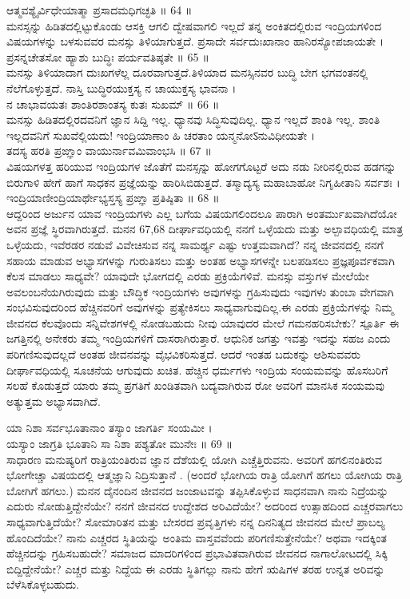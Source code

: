 ಆತ್ಮವಶ್ಯೈರ್ವಿಧೇಯಾತ್ಮಾ ಪ್ರಸಾದಮಧಿಗಚ್ಛತಿ ॥ 64 ॥\\
 ಮನಸ್ಸನ್ನು ಹಿಡಿತದಲ್ಲಿಟ್ಟುಕೊಂಡು ಆಸಕ್ತಿ ಆಗಲಿ ದ್ವೇಷವಾಗಲಿ ಇಲ್ಲದೆ ತನ್ನ ಅಂಕಿತದಲ್ಲಿರುವ ಇಂದ್ರಿಯಗಳಿಂದ ವಿಷಯಗಳನ್ನು ಬಳಸುವವರ ಮನಸ್ಸು ತಿಳಿಯಾಗುತ್ತದೆ.
ಪ್ರಸಾದೇ ಸರ್ವದುಃಖಾನಾಂ ಹಾನಿರಸ್ಯೋಪಜಾಯತೇ ।\\
ಪ್ರಸನ್ನಚೇತಸೋ ಹ್ಯಾಶು ಬುದ್ಧಿಃ ಪರ್ಯವತಿಷ್ಠತೇ ॥ 65 ॥\\
 ಮನಸ್ಸು ತಿಳಿಯಾದಾಗ ದುಃಖಗಳೆಲ್ಲ ದೂರವಾಗುತ್ತದೆ.ತಿಳಿಯಾದ ಮನಸ್ಸಿನವರ ಬುದ್ಧಿ ಬೇಗ ಭಗವಂತನಲ್ಲಿ ನೆಲೆಗೊಳ್ಳುತ್ತದೆ.
ನಾಸ್ತಿ ಬುದ್ಧಿರಯುಕ್ತಸ್ಯ ನ ಚಾಯುಕ್ತಸ್ಯ ಭಾವನಾ ।\\
ನ ಚಾಭಾವಯತಃ ಶಾಂತಿರಶಾಂತಸ್ಯ ಕುತಃ ಸುಖಮ್ ॥ 66 ॥\\
 ಮನಸ್ಸು ಹಿಡಿತದಲ್ಲಿರದವನಿಗೆ ಜ್ಞಾನ ಸಿದ್ದಿ ಇಲ್ಲ. ಧ್ಯಾನವು ಸಿದ್ಧಿಸುವುದಿಲ್ಲ. ಧ್ಯಾನ ಇಲ್ಲದೆ ಶಾಂತಿ ಇಲ್ಲ. ಶಾಂತಿ ಇಲ್ಲದವನಿಗೆ ಸುಖವೆಲ್ಲಿಯದು!
ಇಂದ್ರಿಯಾಣಾಂ ಹಿ ಚರತಾಂ ಯನ್ಮನೋऽನುವಿಧೀಯತೇ ।\\
ತದಸ್ಯ ಹರತಿ ಪ್ರಙ್ಞಾಂ ವಾಯುರ್ನಾವಮಿವಾಂಭಸಿ ॥ 67 ॥\\
 ವಿಷಯಗಳತ್ತ ಹರಿಯುವ ಇಂದ್ರಿಯಗಳ ಜೊತೆಗೆ ಮನಸ್ಸನ್ನು ಹೋಗಗೊಟ್ಟರೆ ಅದು ನಡು ನೀರಿನಲ್ಲಿರುವ ಹಡಗನ್ನು ಬಿರುಗಾಳಿ ಹೇಗೆ ಹಾಗೆ ಸಾಧಕನ ಪ್ರಜ್ಞೆಯನ್ನು ಹಾರಿಸಿಬಿಡುತ್ತದೆ.
ತಸ್ಮಾದ್ಯಸ್ಯ ಮಹಾಬಾಹೋ ನಿಗೃಹೀತಾನಿ ಸರ್ವಶಃ ।\\
ಇಂದ್ರಿಯಾಣೀಂದ್ರಿಯಾರ್ಥೇಭ್ಯಸ್ತಸ್ಯ ಪ್ರಙ್ಞಾ ಪ್ರತಿಷ್ಠಿತಾ ॥ 68 ॥\\
 ಆದ್ದರಿಂದ ಅರ್ಜುನ ಯಾವ ಇಂದ್ರಿಯಗಳು ಎಲ್ಲ ಬಗೆಯ ವಿಷಯಗಲಿಂದಲೂ ಪಾರಾಗಿ ಅಂತರ್ಮುಖವಾಗಿದೆಯೋ ಅವನ ಪ್ರಜ್ಞೆ ಸ್ಥಿರವಾಗಿರುತ್ತದೆ.
 ಮನನ  67,68
 ದೀರ್ಘಾವಧಿಯಲ್ಲಿ ನನಗೆ ಒಳ್ಳೆಯದು ಮತ್ತು ಅಲ್ಪಾವಧಿಯಲ್ಲಿ ಮಾತ್ರ ಒಳ್ಳೆಯದು, ಇವೆರಡರ ನಡುವೆ ವಿವೇಚಿಸುವ ನನ್ನ ಸಾಮರ್ಥ್ಯ ಎಷ್ಟು ಉತ್ತಮವಾಗಿದೆ? ನನ್ನ ಜೀವನದಲ್ಲಿ ನನಗೆ ಸಹಾಯ ಮಾಡುವ ಅಭ್ಯಾಸಗಳನ್ನು ಗುರುತಿಸಲು ಮತ್ತು ಅಂತಹ ಅಭ್ಯಾಸಗಳನ್ನೇ ಬಲಪಡಿಸಲು ಪ್ರಜ್ಞಪೂರ್ವಕವಾಗಿ ಕೆಲಸ ಮಾಡಲು ಸಾಧ್ಯವೇ?
 ಯಾವುದೇ ಭೋಗದಲ್ಲಿ ಎರಡು ಪ್ರಕ್ರಿಯೆಗಳಿವೆ. ಮನಸ್ಸು ವಸ್ತುಗಳ ಮೇಲೆಯೇ ಅವಲಂಬನೆಯಗಿರುವುದು ಮತ್ತು ಬೌದ್ಧಿಕ ಇಂದ್ರಿಯಗಳು ಅವುಗಳನ್ನು ಗ್ರಹಿಸುವುದು ಇವುಗಳು ತುಂಬಾ ವೇಗವಾಗಿ ಸಂಭವಿಸುವುದರಿಂದ ಹೆಚ್ಚಿನವರಿಗೆ ಅವುಗಳನ್ನು ಪ್ರತ್ಯೇಕಿಸಲು ಸಾಧ್ಯವಾಗುವುದಿಲ್ಲ.ಈ ಎರಡು ಪ್ರಕ್ರಿಯೆಗಳನ್ನು ನಿಮ್ಮ ಜೀವನದ ಕೆಲವೊಂದು ಸನ್ನಿವೇಶಗಳಲ್ಲಿ ನೋಡಬಹುದು ನೀವು ಯಾವುದರ ಮೇಲೆ ಗಮನಹರಿಸಬೇಕು?
 ಸ್ಪೂರ್ತಿ 
 ಈ ಜಗತ್ತಿನಲ್ಲಿ ಅನೇಕರು ತಮ್ಮ ಇಂದ್ರಿಯಗಳಿಗೆ ದಾಸರಾಗಿರುತ್ತಾರೆ. ಆಧುನಿಕ ಜಗತ್ತು ಇವತ್ತು ಇದನ್ನು ಸಹಜ ಎಂದು ಪರಿಗಣಿಸುವುದಲ್ಲದೆ ಅಂತಹ ಜೀವನವನ್ನು ವೈಭವಿಕರಿಸುತ್ತದೆ. ಆದರೆ ಇಂತಹ ಬದುಕನ್ನು ಆಶಿಸುವವರು ದೀರ್ಘಾವಧಿಯಲ್ಲಿ ಸೂಚನೆಯ ಆಗುವುದು ಖಚಿತ. ಹೆಚ್ಚಿನ ಧರ್ಮಗಳು ಇಂದ್ರಿಯ ಸಂಯಮವನ್ನು ಹೊಸಬರಿಗೆ ಸಲಹೆ ಕೊಡುತ್ತದೆ ಯಾರು ತಮ್ಮ ಪ್ರಗತಿಗೆ ಖಂಡಿತವಾಗಿ ಬದ್ಯವಾಗಿರುವ ರೋ ಅವರಿಗೆ ಮಾನಸಿಕ ಸಂಯಮವು ಅತ್ಯುತ್ತಮ ಅಭ್ಯಾಸವಾಗಿದೆ.

ಯಾ ನಿಶಾ ಸರ್ವಭೂತಾನಾಂ ತಸ್ಯಾಂ ಜಾಗರ್ತಿ ಸಂಯಮೀ ।\\
ಯಸ್ಯಾಂ ಜಾಗ್ರತಿ ಭೂತಾನಿ ಸಾ ನಿಶಾ ಪಶ್ಯತೋ ಮುನೇಃ ॥ 69 ॥\\
 ಸಾಧಾರಣ ಮನುಷ್ಯರಿಗೆ ರಾತ್ರಿಯಂತಿರುವ ಜ್ಞಾನ ದೆಶೆಯಲ್ಲಿ ಯೋಗಿ ಎಚ್ಚೆತ್ತಿರುವನು. ಅವರಿಗೆ ಹಗಲಿನಂತಿರುವ ಭೋಗೇಚ್ಚಾ ವಿಷಯದಲ್ಲಿ ಆತ್ಮಜ್ಞಾನಿ ನಿದ್ರಿಸುತ್ತಾನೆ . (ಅಂದರೆ ಭೋಗಿಯ ರಾತ್ರಿ ಯೋಗಿಗೆ ಹಗಲು ಯೋಗಿಯ ರಾತ್ರಿ ಬೋಗಿಗೆ ಹಗಲು.)
 ಮನನ 
 ದೈನಂದಿನ ಜೀವನದ ಜಂಜಾಟವನ್ನು ತಪ್ಪಿಸಿಕೊಳ್ಳುವ ಸಾಧನವಾಗಿ ನಾನು ನಿದ್ರೆಯನ್ನು ಎದುರು ನೋಡುತ್ತಿದ್ದೇನೆಯೇ? ನನಗೆ ಜೀವನದ ಉದ್ದೇಶದ ಅರಿವಿದೆಯೇ? ಅದರಿಂದ ಉತ್ಸಾಹದಿಂದ ಎಚ್ಚರವಾಗಲು ಸಾಧ್ಯವಾಗುತ್ತಿದೆಯೇ? ಸೋಮಾರಿತನ ಮತ್ತು ಬೇಸರದ ಪ್ರವೃತ್ತಿಗಳು ನನ್ನ ದಿನನಿತ್ಯದ ಜೀವನದ ಮೇಲೆ ಪ್ರಾಬಲ್ಯ ಹೊಂದಿದೆಯೇ?
 ನಾನು ಎಚ್ಚರದ ಸ್ಥಿತಿಯನ್ನು ಅಂತಿಮ ವಾಸ್ತವವೆಂದು ಪರಿಗಣಿಸುತ್ತೇನೆಯೇ? ಅಥವಾ ಇದಕ್ಕಿಂತ ಹೆಚ್ಚಿನದನ್ನು ಗ್ರಹಿಸಬಹುದೇ? ಸಮಾಜದ ಮಾದರಿಗಳಿಂದ ಪ್ರಭಾವಿತವಾಗಿರುವ ಜೀವನದ ನಾಗಾಲೋಟದಲ್ಲಿ ಸಿಕ್ಕಿ ಬಿದ್ದಿದ್ದೇನೆಯೇ? ಎಚ್ಚರ ಮತ್ತು ನಿದ್ದೆಯ ಈ ಎರಡು ಸ್ಥಿತಿಗಲ್ಲು ನಾನು ಹೇಗೆ ಋಷಿಗಳ ತರಹ ಉನ್ನತ ಅರಿವನ್ನು ಬೆಳೆಸಿಕೊಳ್ಳಬಹುದು.

